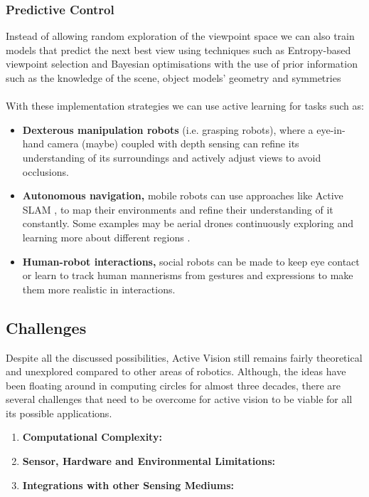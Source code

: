   \subsubsection{Predictive Control}
  Instead of allowing random exploration of the viewpoint space we can also train models that predict the next best view using techniques such as Entropy-based viewpoint selection and Bayesian optimisations with the use of prior information such as the knowledge of the scene, object models' geometry and symmetries \cite{dhami2023prednbvpredictionguidednextbestview3d,breyer2022closedloopnextbestviewplanningtargetdriven}
  \\\\
  With these implementation strategies we can use active learning for tasks such as:
  \begin{itemize}
    \item \textbf{Dexterous manipulation robots} (i.e. grasping robots), where a eye-in-hand camera (maybe) coupled with depth sensing can refine its understanding of its surroundings and actively adjust views to avoid occlusions. 
    \item \textbf{Autonomous navigation,} mobile robots can use approaches like Active SLAM \cite{} , to map their environments and refine their understanding of it constantly. Some examples may be aerial drones continuously exploring and learning more about different regions \cite{}.
    \item \textbf{Human-robot interactions,} social robots can be made to keep eye contact or learn to track human mannerisms from gestures and expressions to make them more realistic in interactions.
  \end{itemize}
    
  \subsection{Challenges}
  Despite all the discussed possibilities, Active Vision still remains fairly theoretical and unexplored compared to other areas of robotics. Although, the ideas have been floating around in computing circles for almost three decades, there are several challenges that need to be overcome for active vision to be viable for all its possible applications.
  \begin{enumerate}
    \item \textbf{Computational Complexity:}
    \item \textbf{Sensor, Hardware and Environmental Limitations:}
    \item \textbf{Integrations with other Sensing Mediums:}
  \end{enumerate}

